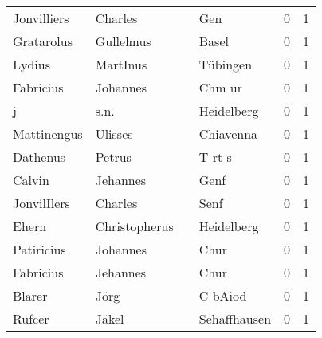 \begin{tabular}{llllrr}
              Jonvilliers &                            Charles &             &                                         Gen &          0 &         1 \\
               Gratarolus &                          Gullelmus &             &                                       Basel &          0 &         1 \\
                   Lydius &                           MartInus &             &                                    Tübingen &          0 &         1 \\
                Fabricius &                           Johannes &             &                                      Chm ur &          0 &         1 \\
                        j &                               s.n. &             &                                  Heidelberg &          0 &         1 \\
              Mattinengus &                            Ulisses &             &                                   Chiavenna &          0 &         1 \\
                 Dathenus &                             Petrus &             &                                      T rt s &          0 &         1 \\
                   Calvin &                           Jehannes &             &                                        Genf &          0 &         1 \\
              JonvilIlers &                            Charles &             &                                        Senf &          0 &         1 \\
                    Ehern &                      Christopherus &             &                                  Heidelberg &          0 &         1 \\
               Patiricius &                           Johannes &             &                                        Chur &          0 &         1 \\
                Fabricius &                           Jehannes &             &                                        Chur &          0 &         1 \\
                   Blarer &                               Jörg &             &                                     C bAiod &          0 &         1 \\
                   Rufcer &                              Jäkel &             &                                Sehaffhausen &          0 &         1 \\

\end{tabular}
